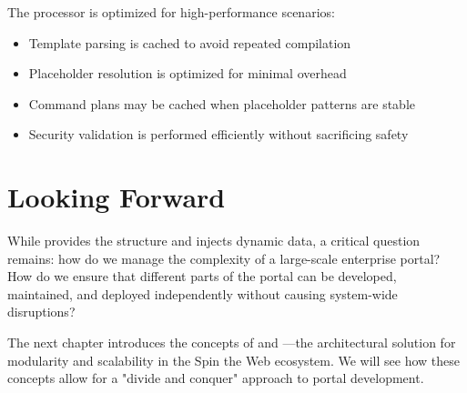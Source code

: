 The \wbpl{} processor is optimized for high-performance scenarios:

\begin{itemize}
\item Template parsing is cached to avoid repeated compilation
\item Placeholder resolution is optimized for minimal overhead
\item Command plans may be cached when placeholder patterns are stable
\item Security validation is performed efficiently without sacrificing safety
\end{itemize}

\section{Looking Forward}
\label{sec:wbpl-forward}

While \wbdl{} provides the structure and \wbpl{} injects dynamic data, a critical question remains: how do we manage the complexity of a large-scale enterprise portal? How do we ensure that different parts of the portal can be developed, maintained, and deployed independently without causing system-wide disruptions?

The next chapter introduces the concepts of \textbf{} and \textbf{}—the architectural solution for modularity and scalability in the Spin the Web ecosystem. We will see how these concepts allow for a "divide and conquer" approach to portal development.
